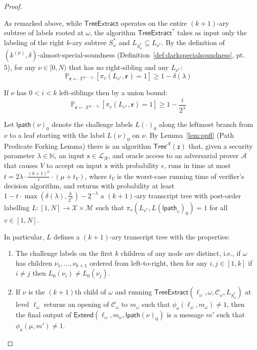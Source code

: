 \begin{proof}
\begin{itemize}
\end{itemize}
As remarked above, while $\textsf{TreeExtract}$ operates on the entire $(k+1)$-ary subtree of labels rooted at $\omega$, the algorithm $\textsf{TreeExtract}^*$ takes as input only the labeling of the right $k$-ary subtree $S^*_\omega$ and $L_{S^*_\omega} \subseteq L_{\nu^*}$. 
By the definition of $(k^{(\mu)}, \delta)$-almost-special-soundness (Definition~\ref{def:darkspecialsoundness}, pt. 5), for any $\nu \in [0,N)$ that has no right-sibling and any $L_{\nu^*}$: 
$$\mathbb{P}_{\mathbf{r} \leftarrow \mathcal{X}^{\mu - \ell_\nu}}[ \pi_v(L_{v^*}, \mathbf{r}) = 1 ] \geq 1 - \delta(\lambda)$$  

If $\nu$ has $0 < i < k$ left-siblings then by a union bound: 
$$\mathbb{P}_{\mathbf{r} \leftarrow \mathcal{X}^{\mu - \ell_\nu}}[ \pi_v(L_{v^*}, \mathbf{r}) = 1 ] \geq 1 - \frac{i}{2^\lambda} $$ 

Let $\textsf{lpath}(\nu)_0$ denote the challenge labels $L(\cdot)_0$ along the leftmost branch from $\nu$ to a leaf starting with the label $L(\nu)_0$ on $\nu$. By Lemma~\ref{lem:ppfl} (Path Predicate Forking Lemma) there is an algorithm $\textsf{Tree}^\mathcal{A}(\mathsf{z})$ that, given a security parameter $\lambda \in \mathbb{N}$, an input $\mathsf{x} \in \mathcal{L}_\mathcal{R}$, and oracle access to an adversarial prover $\mathcal{A}$ that causes $V$ to accept on input $\mathsf{x}$ with probability $\epsilon$, runs in time at most $t = 2\lambda \cdot \frac{(k+1)^\mu}{\epsilon} \cdot (\mu + t_V)$, where $t_V$ is the worst-case running time of verifier's decision algorithm, and returns with probability at least $1 - t \cdot \max(\delta(\lambda), \frac{k}{2^\lambda}) - 2^{-\lambda}$ a $(k+1)$-ary transcript tree with post-order labelling $L:[1,N] \rightarrow \mathcal{X}\times \mathcal{M}$ such that $\pi_v(L_{v^*}, L(\textsf{lpath}_v)_0) = 1$ for all $v \in [1,N]$. 


 In particular, $L$ defines a $(k+1)$-ary transcript tree with the properties: 
\begin{enumerate}
\item The challenge labels on the first $k$ children of any node are distinct, i.e., if $\omega$ has children $\nu_1,...,\nu_{k+1}$ ordered from left-to-right, then for any $i, j \in [1, k]$ if $i \neq j$ then $L_0(\nu_i) \neq L_0(\nu_j)$. 
\item  If $\nu$ is the $(k+1)$th child of $\omega$ and running $\textsf{TreeExtract}(\ell_\omega, \omega, \mathcal{C}_\omega, L_{S^*_\omega})$ at level $\ell_\omega$ returns an opening of $\mathcal{C}_\omega$ to $m_\omega$ such that $\phi_a(\ell_\omega, m_\omega) \neq 1$, then the final output of $\textsf{Extend}(\ell_\omega, m_\omega, \textsf{lpath}(\nu)_0)$ is a message $m'$ such that $\phi_a(\mu, m') \neq 1$. 
\end{enumerate} 


\end{proof}
